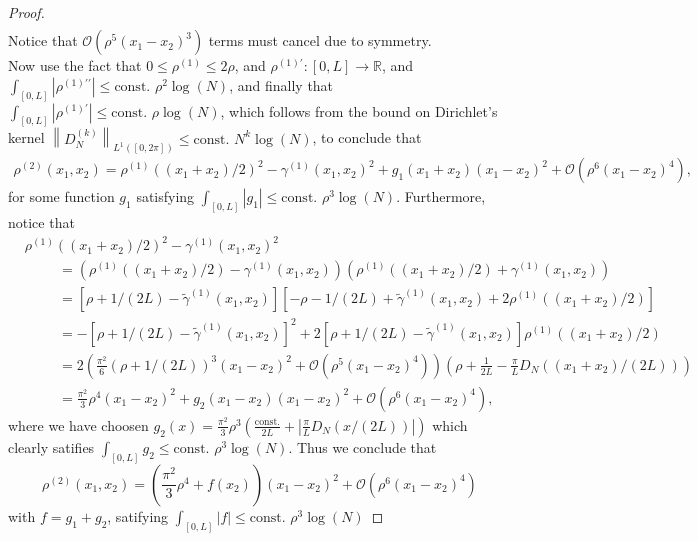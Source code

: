 \documentclass[a4paper,11pt]{article}
\newcommand{\norm}[1]{\left\lVert #1 \right\rVert}
\newcommand{\abs}[1]{\left\lvert #1 \right\rvert}
\newcommand{\R}{\mathbb{R}}
\numberwithin{equation}{section}
\begin{document}
\begin{proof}
\begin{equation}
\begin{aligned}
		\end{aligned}
		\end{equation}
		Notice that $ \mathcal{O}(\rho^5(x_1-x_2)^3) $ terms must cancel due to symmetry.\\
		Now use the fact that $ 0\leq\rho^{(1)}\leq 2\rho $, and $ \rho^{(1)\prime}:[0,L]\to \R $, and $\int_{[0,L]}\abs{\rho^{(1)\prime\prime}}\leq \text{const. }\rho^2\log(N) $, and finally that  $\int_{[0,L]}\abs{\rho^{(1)\prime}}\leq \text{const. }\rho\log(N) $, which follows from the bound on Dirichlet's kernel $ \norm{D_N^{(k)}}_{L^1([0,2\pi])}\leq \text{const. }N^{k}\log(N) $, to conclude that
		\begin{equation}
		\begin{aligned}
		\rho^{(2)}(x_1,x_2)=\rho^{(1)}((x_1+x_2)/2)^2-\gamma^{(1)}(x_1,x_2)^2+g_1(x_1+x_2)(x_1-x_2)^2+\mathcal{O}(\rho^6(x_1-x_2)^4),
		\end{aligned}
		\end{equation}
		for some function $ g_1 $ satisfying $ \int_{[0,L]}\abs{g_1}\leq \text{const. }\rho^3\log(N)$.
		Furthermore, notice that 
		\begin{equation}
		\begin{aligned}
		&\rho^{(1)}((x_1+x_2)/2)^2-\gamma^{(1)}(x_1,x_2)^2\\
		&\hspace{1cm}=(\rho^{(1)}((x_1+x_2)/2)-\gamma^{(1)}(x_1,x_2))(\rho^{(1)}((x_1+x_2)/2)+\gamma^{(1)}(x_1,x_2))\\&\hspace{1cm}
		=\left[\rho+1/(2L)-\tilde{\gamma}^{(1)}(x_1,x_2)\right]\left[-\rho-1/(2L)+\tilde{\gamma}^{(1)}(x_1,x_2)+2\rho^{(1)}((x_1+x_2)/2)\right]\\&\hspace{1cm}
		=-\left[\rho+1/(2L)-\tilde{\gamma}^{(1)}(x_1,x_2)\right]^2+2\left[\rho+1/(2L)-\tilde{\gamma}^{(1)}(x_1,x_2)\right]\rho^{(1)}((x_1+x_2)/2)\\&\hspace{1cm}
		= 2\left(\frac{\pi^2}{6}(\rho+1/(2L))^3(x_1-x_2)^2+\mathcal{O}(\rho^5(x_1-x_2)^4)\right)\left(\rho+\frac{1}{2L}-\frac{\pi}{L}D_{N}((x_1+x_2)/(2L))\right)\\&\hspace{1cm}
		=\frac{\pi^2}{3}\rho^4(x_1-x_2)^2+g_2(x_1-x_2)(x_1-x_2)^2+\mathcal{O}(\rho^6(x_1-x_2)^4),
		\end{aligned}
		\end{equation}
		where we have choosen $ g_2(x)=\frac{\pi^2}{3}\rho^3\left(\frac{\text{const.}}{2L}+\abs{\frac{\pi}{L}D_N(x/(2L))} \right) $ which clearly satifies $  \int_{[0,L]} g_2\leq \text{const. } \rho^3 \log(N) $.
		Thus we conclude that \begin{equation}
		\rho^{(2)}(x_1,x_2)=\left(\frac{\pi^2}{3}\rho^4+f(x_2)\right)(x_1-x_2)^2+\mathcal{O}(\rho^6(x_1-x_2)^4)
		\end{equation}
		with $ f=g_1+g_2 $, satifying $ \int_{[0,L]} \abs{f}\leq \text{const. } \rho^3 \log(N) $
	\end{proof}
\end{document}
